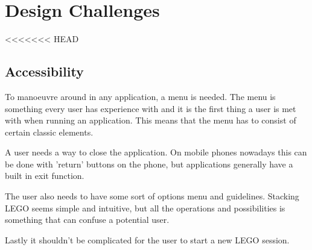 
\section{Design Challenges}
<<<<<<< HEAD
\subsection{Accessibility}
To manoeuvre around in any application, a menu is needed. The menu is something every user has experience with and it is the first thing a user is met with when running an application. This means that the menu has to consist of certain classic elements.\par A user needs a way to close the application. On mobile phones nowadays this can be done with 'return' buttons on the phone, but applications generally have a built in exit function.\par
The user also needs to have some sort of options menu and guidelines. Stacking LEGO seems simple and intuitive, but all the operations and possibilities is something that can confuse a potential user. \par
Lastly it shouldn't be complicated for the user to start a new LEGO session. \par
